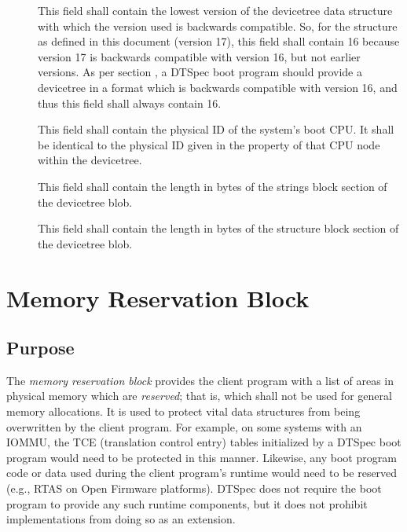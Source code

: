 \documentclass[a4paper,10pt,oneside]{sphinxmanual}
\begin{document}
\begin{description}
\item[{}] \leavevmode
This field shall contain the lowest version of the devicetree data
structure with which the version used is backwards compatible. So,
for the structure as defined in this document (version 17), this
field shall contain 16 because version 17 is backwards compatible
with version 16, but not earlier versions. As per section
{\hyperref[flattened\string-format:sect\string-fdt\string-versioning]{}}, a DTSpec boot program should provide a
devicetree in a format which is backwards compatible with version
16, and thus this field shall always contain 16.

\item[{}] \leavevmode
This field shall contain the physical ID of the system’s boot CPU.
It shall be identical to the physical ID given in the  property
of that CPU node within the devicetree.

\item[{}] \leavevmode
This field shall contain the length in bytes of the strings block
section of the devicetree blob.

\item[{}] \leavevmode
This field shall contain the length in bytes of the structure block
section of the devicetree blob.

\end{description}


\section{Memory Reservation Block}
\label{flattened-format:memory-reservation-block}\label{flattened-format:sect-fdt-memory-reservation-block}

\subsection{Purpose}
\label{flattened-format:purpose}
The \emph{memory reservation block} provides the client program with a list
of areas in physical memory which are \emph{reserved}; that is, which shall
not be used for general memory allocations. It is used to protect vital
data structures from being overwritten by the client program. For
example, on some systems with an IOMMU, the TCE (translation control
entry) tables initialized by a DTSpec boot program would need to be
protected in this manner. Likewise, any boot program code or data used
during the client program’s runtime would need to be reserved (e.g.,
RTAS on Open Firmware platforms). DTSpec does not require the boot
program to provide any such runtime components, but it does not prohibit
implementations from doing so as an extension.
\end{document}
